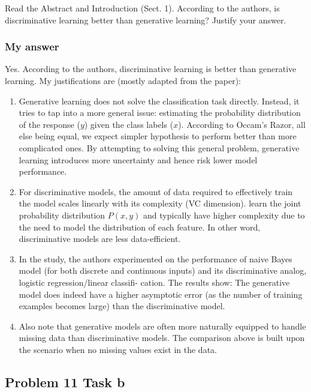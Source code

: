 \documentclass[
]{article}
\begin{document}
Read the Abstract and Introduction (Sect. 1). According to the authors,
is discriminative learning better than generative learning? Justify your
answer.

\hypertarget{my-answer-5}{%
\subsubsection{My answer}\label{my-answer-5}}

Yes. According to the authors, discriminative learning is better than
generative learning. My justifications are (mostly adapted from the
paper):

\begin{enumerate}
\def\labelenumi{\alph{enumi}.}
\item
  Generative learning does not solve the classification task directly.
  Instead, it tries to tap into a more general issue: estimating the
  probability distribution of the response (\(y\)) given the class
  labels (\(x\)). According to Occam's Razor, all else being equal, we
  expect simpler hypothesis to perform better than more complicated
  ones. By attempting to solving this general problem, generative
  learning introduces more uncertainty and hence risk lower model
  performance.
\item
  For discriminative models, the amount of data required to effectively
  train the model scales linearly with its complexity (VC dimension).
  learn the joint probability distribution \(P(x, y)\) and typically
  have higher complexity due to the need to model the distribution of
  each feature. In other word, discriminative models are less
  data-efficient.
\item
  In the study, the authors experimented on the performance of naive
  Bayes model (for both discrete and continuous inputs) and its
  discriminative analog, logistic regression/linear classifi- cation.
  The results show: The generative model does indeed have a higher
  asymptotic error (as the number of training examples becomes large)
  than the discriminative model.
\item
  Also note that generative models are often more naturally equipped to
  handle missing data than discriminative models. The comparison above
  is built upon the scenario when no missing values exist in the data.
\end{enumerate}

\hypertarget{problem-11-task-b}{%
\subsection{Problem 11 Task b}\label{problem-11-task-b}}
\end{document}
